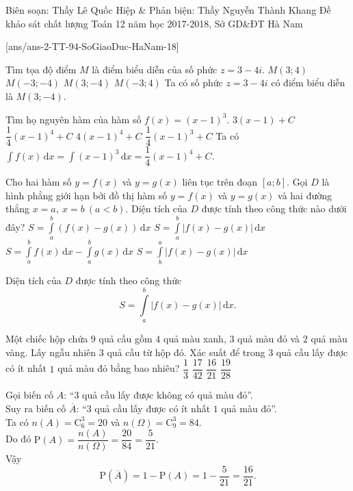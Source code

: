 \begin{name}
{Biên soạn: Thầy Lê Quốc Hiệp \& Phản biện: Thầy Nguyễn Thành Khang}
{Đề khảo sát chất lượng Toán 12 năm học 2017-2018, Sở GD\&ĐT Hà Nam}
\end{name}
\setcounter{ex}{0}
[ans/ans-2-TT-94-SoGiaoDuc-HaNam-18]

\begin{ex}%
	Tìm tọa độ điểm $M$ là điểm biểu diễn của số phức $z=3-4i$.
	\choice
	{$M(3;4)$}
	{$M(-3;-4)$}
	{\True $M(3;-4)$}
	{$M(-3;4)$}
	\loigiai
	{
		Ta có số phức $z=3-4i$ có điểm biểu diễn là $M(3;-4)$.
	}
\end{ex} 

\begin{ex}%
	Tìm họ nguyên hàm của hàm số $f(x)=(x-1)^3$.
	\choice
	{$3(x-1)+C$}
	{\True $\dfrac{1}{4}(x-1)^4+C$}
	{$4(x-1)^4+C$}
	{$\dfrac{1}{4}(x-1)^3+C$}
	\loigiai
	{
		Ta có $\displaystyle\int f(x)\mathrm{\,d}x=\displaystyle\int (x-1)^3\mathrm{\,d}x=\dfrac{1}{4}(x-1)^4+C$.
	}
\end{ex}

\begin{ex}%
	Cho hai hàm số $y=f(x)$ và $y=g(x)$ liên tục trên đoạn $[a;b]$. Gọi $D$ là hình phẳng giới hạn bởi đồ thị hàm số $y=f(x)$ và $y=g(x)$ và hai đường thẳng $x=a,~x=b~(a<b)$. Diện tích của $D$ được tính theo công thức nào dưới đây?
	\choice
	{$S=\displaystyle\int\limits_a^b \left(f(x)-g(x)\right)\mathrm{\,d}x$}
	{\True $S=\displaystyle\int\limits_a^b \left| f(x)-g(x)\right|\mathrm{\,d}x$}
	{$S=\displaystyle\int\limits_a^b f(x)\mathrm{\,d}x-\displaystyle\int\limits_a^b g(x)\mathrm{\,d}x$}
	{$S=\displaystyle\int\limits_b^a \left| f(x)-g(x)\right|\mathrm{\,d}x$}
	\loigiai
	{
		Diện tích của $D$ được tính theo công thức
		\[S=\displaystyle\int\limits_a^b \left| f(x)-g(x)\right|\mathrm{\,d}x.\]
		
	}
\end{ex}

\begin{ex}%
	Một chiếc hộp chứa $9$ quả cầu gồm $4$ quả màu xanh, $3$ quả màu đỏ và $2$ quả màu vàng. Lấy ngẫu nhiên $3$ quả cầu từ hộp đó. Xác suất để trong $3$ quả cầu lấy được có ít nhất $1$ quả màu đỏ bằng bao nhiêu? 
	\choice
	{$\dfrac{1}{3}$}
	{$\dfrac{17}{42}$}
	{\True $\dfrac{16}{21}$}
	{$\dfrac{19}{28}$}
	\loigiai
	{
		Gọi biến cố $A$: ``$3$ quả cầu lấy được không có quả màu đỏ''.\\
		Suy ra biến cố $\overline{A}$: ``$3$ quả cầu lấy được có ít nhất $1$  quả màu đỏ''.\\
		Ta có $n(A)=\mathrm{C}_6^3=20$ và $n(\Omega)=\mathrm{C}_9^3=84$.\\
		Do đó $\mathrm{P}(A)=\dfrac{n(A)}{n(\Omega)}=\dfrac{20}{84}=\dfrac{5}{21}$.\\
		Vậy 
		\[\mathrm{P}(\overline{A})=1-\mathrm{P}(A)=1-\dfrac{5}{21}=\dfrac{16}{21}.\]
		
	}
\end{ex}


